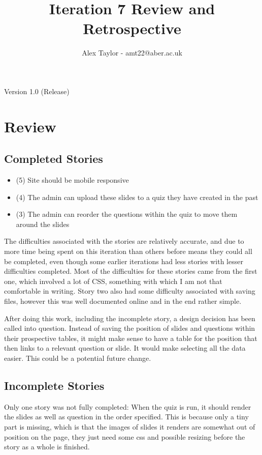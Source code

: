 \documentclass{article}
\title{Iteration 7 Review and Retrospective}
\author{Alex Taylor - amt22@aber.ac.uk}
\begin{document}
\maketitle
\begin{center}
	Version 1.0 (Release)
\end{center}
\tableofcontents
\thispagestyle{empty}
\newpage

\section{Review}
\subsection{Completed Stories}
\begin{itemize}
	\item (5) Site should be mobile responsive
	\item (4) The admin can upload these slides to a quiz they have created in the past
	\item (3) The admin can reorder the questions within the quiz to move them around the slides
\end{itemize}
The difficulties associated with the stories are relatively accurate, and due to more time being spent on this iteration than others before means they could all be completed, even though some earlier iterations had less stories with lesser difficulties completed. Most of the difficulties for these stories came from the first one, which involved a lot of CSS, something with which I am not that comfortable in writing. Story two also had some difficulty associated with saving files, however this was well documented online and in the end rather simple.

After doing this work, including the incomplete story, a design decision has been called into question. Instead of saving the position of slides and questions within their prospective tables, it might make sense to have a table for the position that then links to a relevant question or slide. It would make selecting all the data easier. This could be a potential future change.
\subsection{Incomplete Stories}
Only one story was not fully completed: When the quiz is run, it should render the slides as well as question in the order specified. This is because only a tiny part is missing, which is that the images of slides it renders are somewhat out of position on the page, they just need some css and possible resizing before the story as a whole is finished.
\newpage
\end{document}

